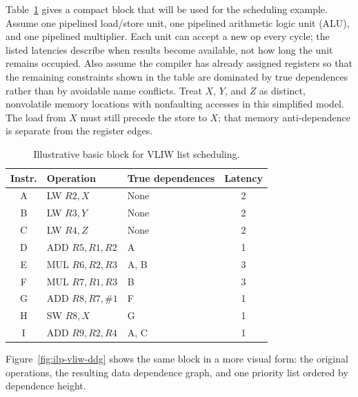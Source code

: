 Table~\ref{tab:ilp-vliw-block} gives a compact block that will be used for the scheduling example.
Assume one pipelined load/store unit, one pipelined arithmetic logic unit (ALU), and one pipelined multiplier.
Each unit can accept a new op every cycle; the listed latencies describe when results become available, not how long the unit remains occupied.
Also assume the compiler has already assigned registers so that the remaining constraints shown in the table are dominated by true dependences rather than by avoidable name conflicts.
Treat $X$, $Y$, and $Z$ as distinct, nonvolatile memory locations with nonfaulting accesses in this simplified model.
The load from $X$ must still precede the store to $X$; that memory anti-dependence is separate from the register edges.
\begin{table}[t]
    \centering
    \renewcommand{\arraystretch}{1.15}
    \begin{tabular}{|c|l|l|c|}
        \hline
        Instr.
        & Operation         & True dependences & Latency \\
        \hline
        A & LW $R2, X$        & None             & 2       \\
        \hline
        B & LW $R3, Y$        & None             & 2       \\
        \hline
        C & LW $R4, Z$        & None             & 2       \\
        \hline
        D & ADD $R5, R1, R2$  & A                & 1       \\
        \hline
        E & MUL $R6, R2, R3$  & A, B             & 3       \\
        \hline
        F & MUL $R7, R1, R3$  & B                & 3       \\
        \hline
        G & ADD $R8, R7, \#1$ & F                & 1       \\
        \hline
        H & SW $R8, X$        & G                & 1       \\
        \hline
        I & ADD $R9, R2, R4$  & A, C             & 1       \\
        \hline
    \end{tabular}
    \caption{Illustrative basic block for VLIW list scheduling.}
    \label{tab:ilp-vliw-block}
\end{table}
Figure~\ref{fig:ilp-vliw-ddg} shows the same block in a more visual form: the original operations, the resulting data dependence graph, and one priority list ordered by dependence height.
